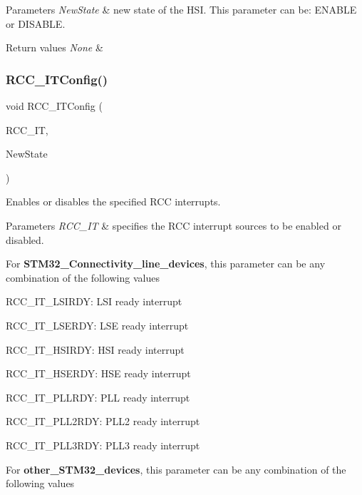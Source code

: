 \begin{DoxyParams}{Parameters}
{\em New\+State} & new state of the H\+SI. This parameter can be\+: E\+N\+A\+B\+LE or D\+I\+S\+A\+B\+LE. \\
\hline
\end{DoxyParams}

\begin{DoxyRetVals}{Return values}
{\em None} & \\
\hline
\end{DoxyRetVals}
\mbox{\label{group___r_c_c___private___functions_gaa953aa226e9ce45300d535941e4dfe2f}} 
\subsubsection{\texorpdfstring{RCC\_ITConfig()}{RCC\_ITConfig()}}
{\footnotesize\ttfamily void R\+C\+C\+\_\+\+I\+T\+Config (\begin{DoxyParamCaption}\item[{uint8\+\_\+t}]{R\+C\+C\+\_\+\+IT,  }\item[{\mbox{\hyperlink{group___exported__types_gac9a7e9a35d2513ec15c3b537aaa4fba1}{Functional\+State}}}]{New\+State }\end{DoxyParamCaption})}



Enables or disables the specified R\+CC interrupts. 


\begin{DoxyParams}{Parameters}
{\em R\+C\+C\+\_\+\+IT} & specifies the R\+CC interrupt sources to be enabled or disabled.\\
\hline
\end{DoxyParams}
For {\bfseries{S\+T\+M32\+\_\+\+Connectivity\+\_\+line\+\_\+devices}}, this parameter can be any combination of the following values

\begin{DoxyItemize}
\item R\+C\+C\+\_\+\+I\+T\+\_\+\+L\+S\+I\+R\+DY\+: L\+SI ready interrupt \item R\+C\+C\+\_\+\+I\+T\+\_\+\+L\+S\+E\+R\+DY\+: L\+SE ready interrupt \item R\+C\+C\+\_\+\+I\+T\+\_\+\+H\+S\+I\+R\+DY\+: H\+SI ready interrupt \item R\+C\+C\+\_\+\+I\+T\+\_\+\+H\+S\+E\+R\+DY\+: H\+SE ready interrupt \item R\+C\+C\+\_\+\+I\+T\+\_\+\+P\+L\+L\+R\+DY\+: P\+LL ready interrupt \item R\+C\+C\+\_\+\+I\+T\+\_\+\+P\+L\+L2\+R\+DY\+: P\+L\+L2 ready interrupt \item R\+C\+C\+\_\+\+I\+T\+\_\+\+P\+L\+L3\+R\+DY\+: P\+L\+L3 ready interrupt\end{DoxyItemize}
For {\bfseries{other\+\_\+\+S\+T\+M32\+\_\+devices}}, this parameter can be any combination of the following values

